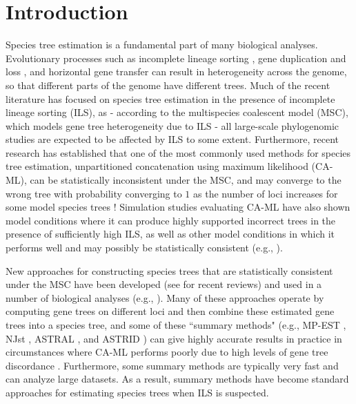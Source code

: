 
\section{Introduction}
   

Species tree estimation is a fundamental part of many biological
analyses. Evolutionary processes such as incomplete lineage sorting
\cite{maddison1997gene}, 
gene duplication and loss
\cite{ohno},
and horizontal gene transfer
\cite{woese2002evolution}
can result in heterogeneity across the genome, so that different parts
of the genome have different trees.  
Much of the recent literature has focused on species tree estimation in the presence of incomplete lineage sorting (ILS),
as - according to the multispecies coalescent model (MSC), which models gene tree heterogeneity due to ILS  -  all large-scale phylogenomic studies are expected to be affected by ILS to some extent.
Furthermore, recent research has
established that one of the most commonly used methods for species
tree estimation, unpartitioned concatenation using maximum likelihood
(CA-ML), can be statistically inconsistent under the MSC, and 
may converge to the wrong
 tree with probability converging to $1$ as the number of loci increases for some model species trees \cite{roch2015likelihood}!
Simulation studies evaluating  CA-ML have  also shown model conditions where it
can produce highly supported incorrect trees 
in the presence of sufficiently high ILS, as well as other model conditions in which
it performs well and may possibly be statistically consistent  (e.g., \cite{KubatkoDegnan2007,DeGiorgio2010}).



New approaches for constructing species trees that are statistically
consistent under the MSC have been developed
(see  \cite{mallo-posada-2016,allman2017split} for recent reviews)
and used in a number of biological
analyses (e.g., \cite{Song2012,jarvis2014whole,
  wickett2014phylotranscriptomic,Mitchell01012017,hosner2016rapid}).  
Many of these approaches
operate by computing gene trees on different loci and then combine
these estimated gene trees into a species tree, and some of these
``summary methods" (e.g., MP-EST \cite{Liu2010a},  NJst \cite{liu2011estimating}, ASTRAL \cite{astral,mirarab2015astral,astral3}, and ASTRID  \cite{vachaspati2015astrid}) can give highly accurate results in practice in
circumstances where CA-ML performs poorly due to high levels of gene
tree discordance
\cite{Liu2010a,mirarab2016evaluating,vachaspati2015astrid}.  
Furthermore, some summary
methods are typically very fast and can analyze large datasets.
As a result, summary methods have become standard approaches for estimating species trees when ILS is suspected.



